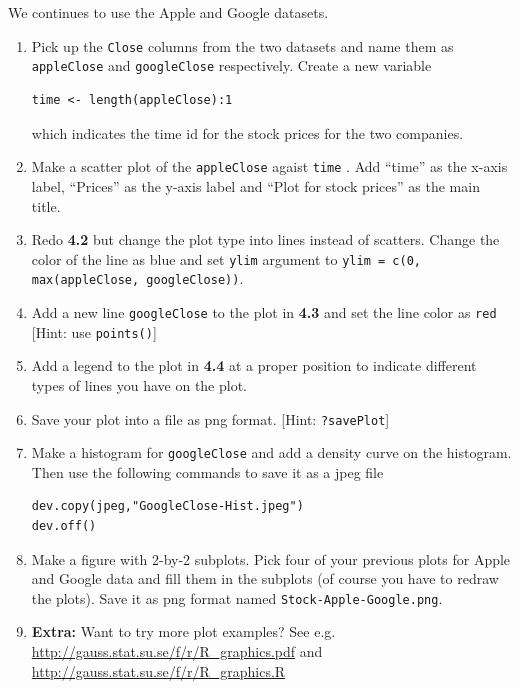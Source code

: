 \documentclass[a4paper]{article}
\begin{document}
\section{}
We continues to use the Apple and Google datasets.
\begin{enumerate}
\item Pick up the \texttt{Close} columns from the two datasets and name them as
  \texttt{appleClose} and \texttt{googleClose} respectively. Create a new
  variable
\begin{verbatim}
time <- length(appleClose):1
\end{verbatim}
which indicates the time id for the stock prices for the two companies.

\item Make a scatter plot of the \texttt{appleClose} agaist \texttt{time}
. Add ``time'' as the x-axis label, ``Prices'' as the
y-axis label and ``Plot for stock prices'' as the main title. 

\item Redo \textbf{4.2} but change the plot type into lines instead of
  scatters. Change the color of the line as blue and set \texttt{ylim} argument
  to \texttt{ylim = c(0, max(appleClose, googleClose))}.

\item Add a new line \texttt{googleClose} to the plot in \textbf{4.3} and set
  the line color as \texttt{red} [Hint: use \texttt{points()}]

\item Add a legend to the plot in \textbf{4.4} at a proper position to indicate
  different types of lines you have on the plot.

\item Save your plot into a file as png format. [Hint: \texttt{?savePlot}]

\item Make a histogram for \texttt{googleClose} and add a density curve on the
  histogram. Then use the following commands to save it as a jpeg file
 
\begin{verbatim}
dev.copy(jpeg,"GoogleClose-Hist.jpeg")
dev.off()
\end{verbatim}

\item Make a figure with 2-by-2 subplots. Pick four of your previous plots for
  Apple and Google data and fill them in the subplots (of course you have to
  redraw the plots). Save it as png format
  named \texttt{Stock-Apple-Google.png}.

\item \textbf{Extra:} Want to try more plot examples? See e.g.
  \url{http://gauss.stat.su.se/f/r/R_graphics.pdf} and
  \url{http://gauss.stat.su.se/f/r/R_graphics.R}
\end{enumerate}
 
\end{document}
